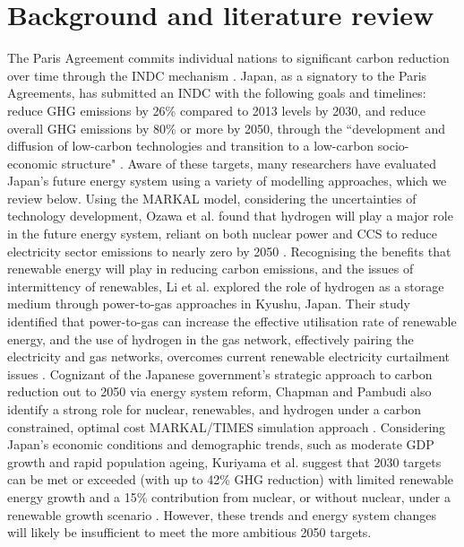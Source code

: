 \section{Background and literature review} \label{litreview}
The Paris Agreement commits individual nations to significant carbon reduction over time through the \gls{INDC} mechanism \cite{united_nations_framework_convention_on_climate_change_unfccc_submission_2015}. Japan, as a signatory to the Paris Agreements, has submitted an INDC with the following goals and timelines: reduce GHG emissions by 26\% compared to 2013 levels by 2030, and reduce overall GHG emissions by 80\% or more by 2050, through the ``development and diffusion of low-carbon technologies and transition to a low-carbon socio-economic structure" \cite{united_nations_framework_convention_on_climate_change_unfccc_submission_2015}. 
Aware of these targets, many researchers have evaluated Japan's future energy system using a variety of modelling approaches, which we review below. Using the \gls{MARKAL} model, considering the uncertainties of technology development, Ozawa et al. found that hydrogen will play a major role in the future energy system, reliant on both nuclear power and \gls{CCS} to reduce electricity sector emissions to nearly zero by 2050 \cite{ozawa_hydrogen_2018}. Recognising the benefits that renewable energy will play in reducing carbon emissions, and the issues of intermittency of renewables, Li et al. explored the role of hydrogen as a storage medium through power-to-gas approaches in Kyushu, Japan. Their study identified that power-to-gas can increase the effective utilisation rate of renewable energy, and the use of hydrogen in the gas network, effectively pairing the electricity and gas networks, overcomes current renewable electricity curtailment issues \cite{li_potential_2019}. Cognizant of the Japanese government's strategic approach to carbon reduction out to 2050 via energy system reform, Chapman and Pambudi also identify a strong role for nuclear, renewables, and hydrogen under a carbon constrained, optimal cost MARKAL/TIMES simulation approach \cite{chapman_strategic_2018}. Considering Japan's economic conditions and demographic trends, such as moderate GDP growth and rapid population ageing, Kuriyama et al. suggest that 2030 targets can be met or exceeded (with up to 42\% GHG reduction) with limited renewable energy growth and a 15\% contribution from nuclear, or without nuclear, under a renewable growth scenario \cite{kuriyama_can_2019}. However, these trends and energy system changes will likely be insufficient to meet the more ambitious 2050 targets. 

